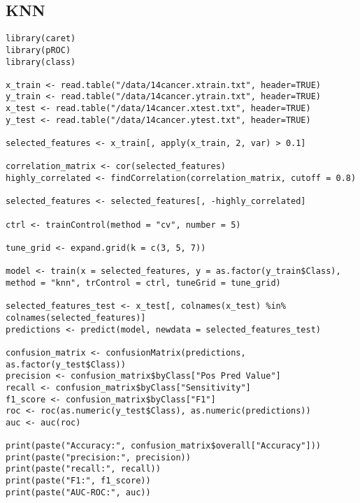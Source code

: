 \documentclass{article}
\begin{document}
\subsection{KNN}
\begin{lstlisting}
library(caret)
library(pROC)
library(class)

x_train <- read.table("/data/14cancer.xtrain.txt", header=TRUE)
y_train <- read.table("/data/14cancer.ytrain.txt", header=TRUE)
x_test <- read.table("/data/14cancer.xtest.txt", header=TRUE)
y_test <- read.table("/data/14cancer.ytest.txt", header=TRUE)

selected_features <- x_train[, apply(x_train, 2, var) > 0.1]

correlation_matrix <- cor(selected_features)
highly_correlated <- findCorrelation(correlation_matrix, cutoff = 0.8)

selected_features <- selected_features[, -highly_correlated]

ctrl <- trainControl(method = "cv", number = 5)

tune_grid <- expand.grid(k = c(3, 5, 7))

model <- train(x = selected_features, y = as.factor(y_train$Class), method = "knn", trControl = ctrl, tuneGrid = tune_grid)

selected_features_test <- x_test[, colnames(x_test) %in% colnames(selected_features)]
predictions <- predict(model, newdata = selected_features_test)

confusion_matrix <- confusionMatrix(predictions, as.factor(y_test$Class))
precision <- confusion_matrix$byClass["Pos Pred Value"]
recall <- confusion_matrix$byClass["Sensitivity"]
f1_score <- confusion_matrix$byClass["F1"]
roc <- roc(as.numeric(y_test$Class), as.numeric(predictions))
auc <- auc(roc)

print(paste("Accuracy:", confusion_matrix$overall["Accuracy"]))
print(paste("precision:", precision))
print(paste("recall:", recall))
print(paste("F1:", f1_score))
print(paste("AUC-ROC:", auc))
\end{lstlisting}
\newpage
\end{document}
